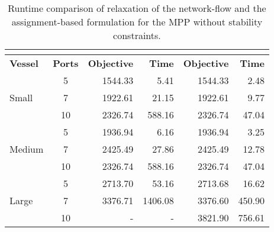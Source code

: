 \documentclass[preprint,12pt,authoryear]{elsarticle}
\begin{document}
\begin{table}[]
    \centering
    \scriptsize
    \caption{Runtime comparison of relaxation of the network-flow and the assignment-based formulation for the MPP without stability constraints.}
    \label{tab:MP_simple_comparison_relaxed}
\begin{tabular}{lc|rr|rr}
    \multicolumn{2}{c|}{\textbf{}}           & \multicolumn{2}{c|}{\textbf{\cite{Chao2021}}} & \multicolumn{2}{c}{\textbf{\cite{Pacino2011FastVessels}}} \\ \hline
    \textbf{Vessel}         & \textbf{Ports} & \textbf{Objective} & \textbf{Time} & \textbf{Objective}  & \textbf{Time} \\ \hline
    \multirow{3}{*}{Small}  & 5              & 1544.33            & 5.41          & 1544.33             & 2.48          \\
                            & 7              & 1922.61            & 21.15         & 1922.61             & 9.77          \\
                            & 10             & 2326.74            & 588.16        & 2326.74             & 47.04         \\ \hline
    \multirow{3}{*}{Medium} & 5              & 1936.94            & 6.16          & 1936.94             & 3.25          \\
                            & 7              & 2425.49            & 27.86         & 2425.49             & 12.78         \\
                            & 10             & 2326.74            & 588.16        & 2326.74             & 47.04         \\ \hline
    \multirow{3}{*}{Large}  & 5              & 2713.70            & 53.16         & 2713.68             & 16.62         \\
                            & 7              & 3376.71            & 1406.08       & 3376.60             & 450.90        \\
                            & 10             & -                  & -             & 3821.90             & 756.61        \\ \hline
    \end{tabular}
    
\end{table}
\end{document}
